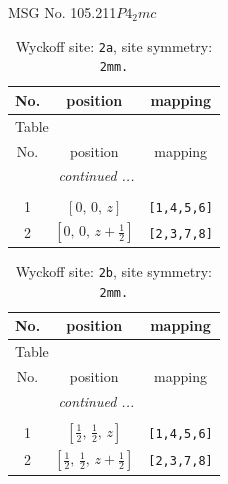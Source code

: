 \documentclass[fleqn,8pt]{jsarticle}
\begin{document}
\setcounter{MaxMatrixCols}{32}

\renewcommand{\tablename}{Table~}
\renewcommand{\figurename}{Figure~}
\begin{center}
\LARGE
MSG No. 105.211\quad$P4_{2}mc$
\end{center}
\renewcommand{\arraystretch}{1.2}
\begin{longtable}{ccc}
\caption{Wyckoff site: {\tt 2a}, site symmetry: {\tt 2mm.}}
 \\
 \hline \hline
No. & position & mapping \\ \hline \endfirsthead

\multicolumn{2}{l}{\tablename\ \thetable{}} \\
 \hline \hline
No. & position & mapping \\ \hline \endhead

 \hline \hline
\multicolumn{2}{r}{\footnotesize\it continued ...} \\ \endfoot

 \hline \hline
\multicolumn{2}{r}{} \\ \endlastfoot

1 & $\left[ 0,\, 0,\, z \right]$ & {\tt [1,4,5,6]} \\ \hline
2 & $\left[ 0,\, 0,\, z + \frac{1}{2} \right]$ & {\tt [2,3,7,8]} \\
\end{longtable}
\renewcommand{\arraystretch}{1.2}
\begin{longtable}{ccc}
\caption{Wyckoff site: {\tt 2b}, site symmetry: {\tt 2mm.}}
 \\
 \hline \hline
No. & position & mapping \\ \hline \endfirsthead

\multicolumn{2}{l}{\tablename\ \thetable{}} \\
 \hline \hline
No. & position & mapping \\ \hline \endhead

 \hline \hline
\multicolumn{2}{r}{\footnotesize\it continued ...} \\ \endfoot

 \hline \hline
\multicolumn{2}{r}{} \\ \endlastfoot

1 & $\left[ \frac{1}{2},\, \frac{1}{2},\, z \right]$ & {\tt [1,4,5,6]} \\ \hline
2 & $\left[ \frac{1}{2},\, \frac{1}{2},\, z + \frac{1}{2} \right]$ & {\tt [2,3,7,8]} \\
\end{longtable}
\end{document}
